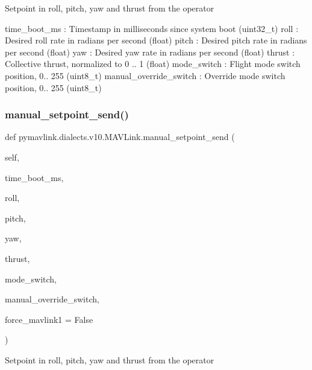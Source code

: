 \begin{DoxyVerb}
\begin{DoxyVerb}
\begin{DoxyVerb}
\begin{DoxyVerb}
\begin{DoxyVerb}Setpoint in roll, pitch, yaw and thrust from the operator

time_boot_ms              : Timestamp in milliseconds since system boot (uint32_t)
roll                      : Desired roll rate in radians per second (float)
pitch                     : Desired pitch rate in radians per second (float)
yaw                       : Desired yaw rate in radians per second (float)
thrust                    : Collective thrust, normalized to 0 .. 1 (float)
mode_switch               : Flight mode switch position, 0.. 255 (uint8_t)
manual_override_switch        : Override mode switch position, 0.. 255 (uint8_t)\end{DoxyVerb}
 \mbox{\label{classpymavlink_1_1dialects_1_1v10_1_1MAVLink_a59e40f9f9a824cb43963e4eb6bff383e}} 
\subsubsection{\texorpdfstring{manual\+\_\+setpoint\+\_\+send()}{manual\_setpoint\_send()}}
{\footnotesize\ttfamily def pymavlink.\+dialects.\+v10.\+M\+A\+V\+Link.\+manual\+\_\+setpoint\+\_\+send (\begin{DoxyParamCaption}\item[{}]{self,  }\item[{}]{time\+\_\+boot\+\_\+ms,  }\item[{}]{roll,  }\item[{}]{pitch,  }\item[{}]{yaw,  }\item[{}]{thrust,  }\item[{}]{mode\+\_\+switch,  }\item[{}]{manual\+\_\+override\+\_\+switch,  }\item[{}]{force\+\_\+mavlink1 = {\ttfamily False} }\end{DoxyParamCaption})}

\begin{DoxyVerb}Setpoint in roll, pitch, yaw and thrust from the operator


\end{DoxyVerb}
\end{DoxyVerb}
\end{DoxyVerb}
\end{DoxyVerb}
\end{DoxyVerb}
